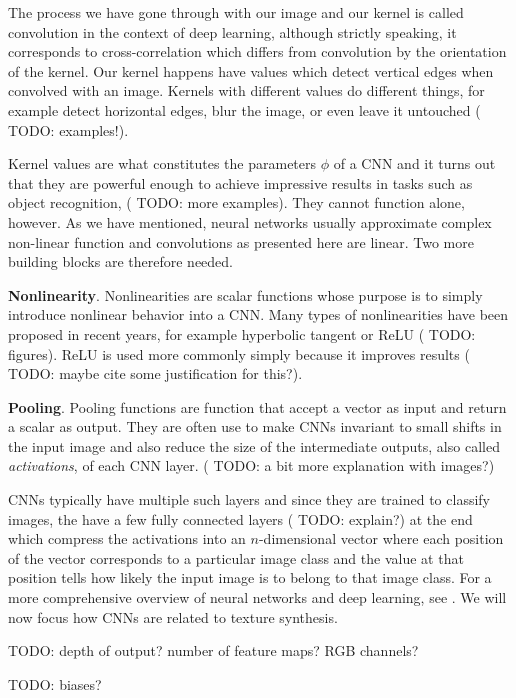 The process we have gone through with our image and our kernel is called convolution in the context of deep learning, although strictly speaking, it corresponds to cross-correlation which differs from convolution by the orientation of the kernel. Our kernel happens have values which detect vertical edges when convolved with an image. Kernels with different values do different things, for example detect horizontal edges, blur the image, or even leave it untouched ({\color{red} TODO: examples!}).

Kernel values are what constitutes the parameters \(\phi\) of a CNN and it turns out that they are powerful enough to achieve impressive results in tasks such as object recognition, ({\color{red} TODO: more examples}). They cannot function alone, however. As we have mentioned, neural networks usually approximate complex non-linear function and convolutions as presented here are linear. Two more building blocks are therefore needed.

\textbf{Nonlinearity}. Nonlinearities are scalar functions whose purpose is to simply introduce nonlinear behavior into a CNN. Many types of nonlinearities have been proposed in recent years, for example hyperbolic tangent or ReLU ({\color{red} TODO: figures}). ReLU is used more commonly simply because it improves results ({\color{red} TODO: maybe cite some justification for this?}).

\textbf{Pooling}. Pooling functions are function that accept a vector as input and return a scalar as output. They are often use to make CNNs invariant to small shifts in the input image and also reduce the size of the intermediate outputs, also called \textit{activations}, of each CNN layer. ({\color{red} TODO: a bit more explanation with images?})

CNNs typically have multiple such layers and since they are trained to classify images, the have a few fully connected layers ({\color{red} TODO:  explain?}) at the end which compress the activations into an \(n\)-dimensional vector where each position of the vector corresponds to a particular image class and the value at that position tells how likely the input image is to belong to that image class. For a more comprehensive overview of neural networks and deep learning, see \citet{Goodfellow2016}. We will now focus how CNNs are related to texture synthesis.

{\color{red} TODO: depth of output? number of feature maps? RGB channels?}

{\color{red} TODO: biases?}

